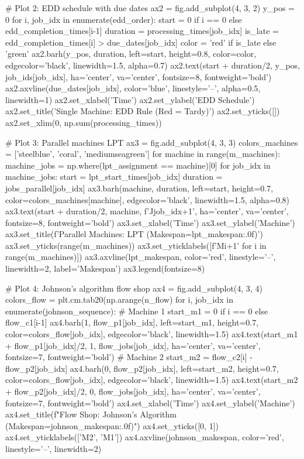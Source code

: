 \documentclass[a4paper, 11pt]{article}
\begin{document}
\begin{pycode}
# Plot 2: EDD schedule with due dates
ax2 = fig.add_subplot(4, 3, 2)
y_pos = 0
for i, job_idx in enumerate(edd_order):
    start = 0 if i == 0 else edd_completion_times[i-1]
    duration = processing_times[job_idx]
    is_late = edd_completion_times[i] > due_dates[job_idx]
    color = 'red' if is_late else 'green'
    ax2.barh(y_pos, duration, left=start, height=0.8, color=color, edgecolor='black', linewidth=1.5, alpha=0.7)
    ax2.text(start + duration/2, y_pos, job_ids[job_idx], ha='center', va='center', fontsize=8, fontweight='bold')
    ax2.axvline(due_dates[job_idx], color='blue', linestyle='--', alpha=0.5, linewidth=1)
ax2.set_xlabel('Time')
ax2.set_ylabel('EDD Schedule')
ax2.set_title('Single Machine: EDD Rule (Red = Tardy)')
ax2.set_yticks([])
ax2.set_xlim(0, np.sum(processing_times))

# Plot 3: Parallel machines LPT
ax3 = fig.add_subplot(4, 3, 3)
colors_machines = ['steelblue', 'coral', 'mediumseagreen']
for machine in range(m_machines):
    machine_jobs = np.where(lpt_assignment == machine)[0]
    for job_idx in machine_jobs:
        start = lpt_start_times[job_idx]
        duration = jobs_parallel[job_idx]
        ax3.barh(machine, duration, left=start, height=0.7, color=colors_machines[machine],
                edgecolor='black', linewidth=1.5, alpha=0.8)
        ax3.text(start + duration/2, machine, f'J{job_idx+1}', ha='center', va='center',
                fontsize=8, fontweight='bold')
ax3.set_xlabel('Time')
ax3.set_ylabel('Machine')
ax3.set_title(f'Parallel Machines: LPT (Makespan={lpt_makespan:.0f})')
ax3.set_yticks(range(m_machines))
ax3.set_yticklabels([f'M{i+1}' for i in range(m_machines)])
ax3.axvline(lpt_makespan, color='red', linestyle='--', linewidth=2, label='Makespan')
ax3.legend(fontsize=8)

# Plot 4: Johnson's algorithm flow shop
ax4 = fig.add_subplot(4, 3, 4)
colors_flow = plt.cm.tab20(np.arange(n_flow) %
for i, job_idx in enumerate(johnson_sequence):
    # Machine 1
    start_m1 = 0 if i == 0 else flow_c1[i-1]
    ax4.barh(1, flow_p1[job_idx], left=start_m1, height=0.7, color=colors_flow[job_idx],
            edgecolor='black', linewidth=1.5)
    ax4.text(start_m1 + flow_p1[job_idx]/2, 1, flow_jobs[job_idx], ha='center', va='center',
            fontsize=7, fontweight='bold')
    # Machine 2
    start_m2 = flow_c2[i] - flow_p2[job_idx]
    ax4.barh(0, flow_p2[job_idx], left=start_m2, height=0.7, color=colors_flow[job_idx],
            edgecolor='black', linewidth=1.5)
    ax4.text(start_m2 + flow_p2[job_idx]/2, 0, flow_jobs[job_idx], ha='center', va='center',
            fontsize=7, fontweight='bold')
ax4.set_xlabel('Time')
ax4.set_ylabel('Machine')
ax4.set_title(f"Flow Shop: Johnson's Algorithm (Makespan={johnson_makespan:.0f})")
ax4.set_yticks([0, 1])
ax4.set_yticklabels(['M2', 'M1'])
ax4.axvline(johnson_makespan, color='red', linestyle='--', linewidth=2)


\end{pycode}
\end{document}
